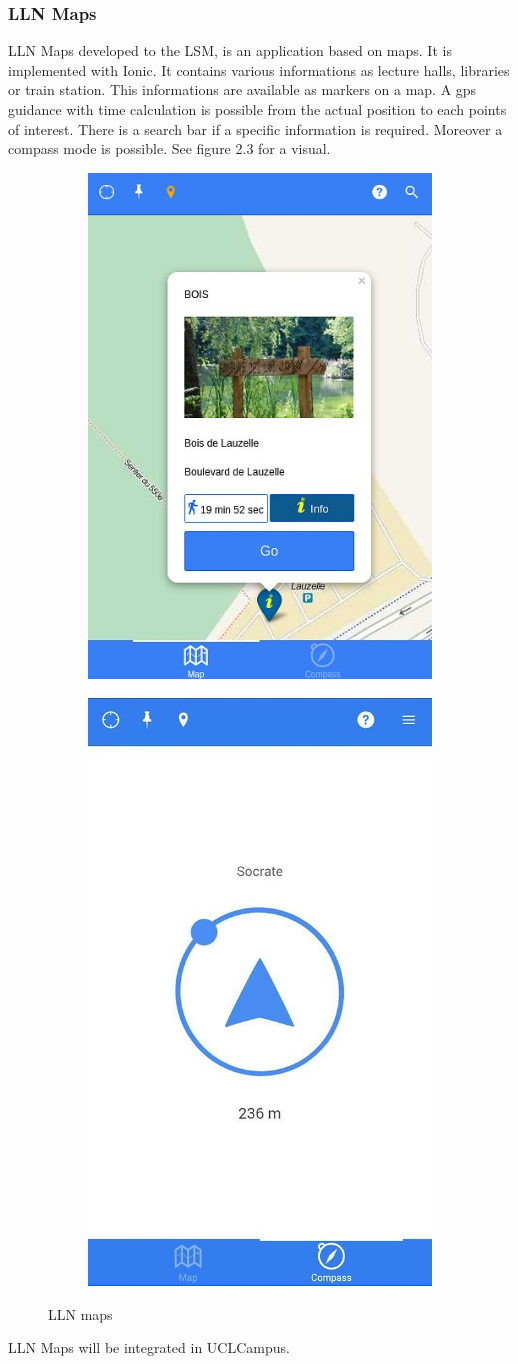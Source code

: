 \documentclass{eplmastersthesis}
\begin{document}
\subsubsection{LLN Maps}
LLN Maps developed to the LSM, is an application based on maps. It is implemented with Ionic. It contains various informations as lecture halls, libraries or train station. This informations are available as markers on a map. A gps guidance with time calculation is possible from the actual position to each points of interest. There is a search bar if a specific information is required. Moreover a compass mode is possible. See figure 2.3 for a visual.  
\begin{figure}
\centering
\begin{subfigure}{.5\textwidth}
  \centering
  \includegraphics[width=.5\linewidth]{Images/llnmaps1.jpg}
  \label{fig:sub1}
\end{subfigure}%
\begin{subfigure}{.5\textwidth}
  \centering
  \includegraphics[width=.5\linewidth]{Images/llnmaps2.jpg}
  \label{fig:sub2}
\end{subfigure}
\caption{LLN maps}
\label{fig:test}
\end{figure}
LLN Maps will be integrated in UCLCampus. 
\end{document}

